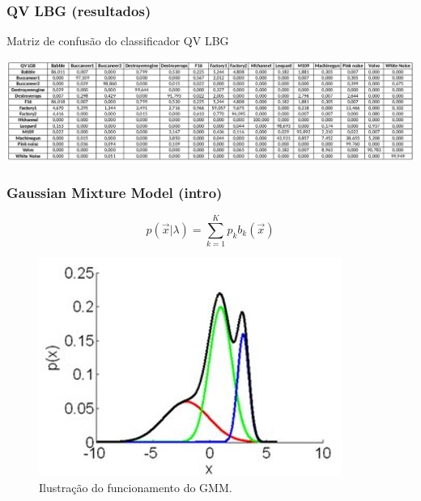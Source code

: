 \documentclass{beamer}
\begin{document}
\begin{frame}

	\frametitle{QV LBG (resultados)}
	
	\begin{table}[h]
		\centering
		\caption{Matriz de confusão do classificador QV LBG}
		\label{tab:confusion_vqlbg}
		\includegraphics[width=\textwidth]{conf_qvlbg.png}
	\end{table}	
	
\end{frame}



\begin{frame}

	\frametitle{Gaussian Mixture Model (intro)}
	
	\begin{minipage}{.45\textwidth}
	
		\begin{equation}
			p(\vec{x}|\lambda) = \sum_{k=1}^{K} p_kb_k(\vec{x})
			\label{eq:gmm}
		\end{equation}
	
	\end{minipage}
	\begin{minipage}{.5\textwidth}
		\begin{figure}
			\includegraphics[width=\linewidth]{gmm01.jpg}
  			\caption{Ilustração do funcionamento do GMM.}
  			\label{fig:gmm1}
		\end{figure}
	\end{minipage}
	
\end{frame}
\end{document}
